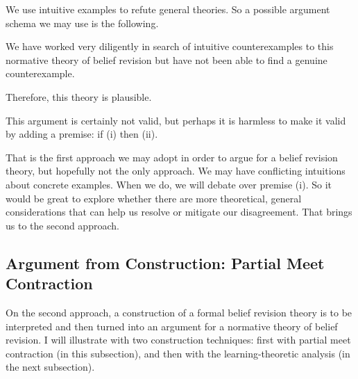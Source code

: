 We use intuitive examples to refute general theories. So a possible argument schema we may use is the following.\op

	\im[(i)] We have worked very diligently in search of intuitive counterexamples to this normative theory of belief revision but have not been able to find a genuine counterexample. 

	\im[(ii)] Therefore, this theory is plausible.

\ed This argument is certainly not valid, but perhaps it is harmless to make it valid by adding a premise: if (i) then (ii).

That is the first approach we may adopt in order to argue for a belief revision theory, but hopefully not the only approach. We may have conflicting intuitions about concrete examples. When we do, we will debate over premise (i). So it would be great to explore whether there are more theoretical, general considerations that can help us resolve or mitigate our disagreement. That brings us to the second approach.


\subsection{Argument from Construction: Partial Meet Contraction}\label{sec-arg-construction-1}

On the second approach, a construction of a formal belief revision theory is to be interpreted and then turned into an argument for a normative theory of belief revision. I will illustrate with two construction techniques: first with partial meet contraction (in this subsection), and then with the learning-theoretic analysis (in the next subsection).

